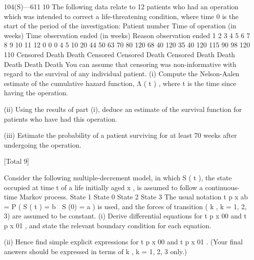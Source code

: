 \documentclass[a4paper,12pt]{article}
\begin{document}
104(S)—611                               10
The following data relate to 12 patients who had an operation which was
intended to correct a life-threatening condition, where time 0 is the start of the
period of the investigation:
Patient number Time of operation
(in weeks) Time observation
ended (in weeks) Reason observation
ended
1
2
3
4
5
6
7
8
9
10
11
12 0
0
0
4
5
10
20
44
50
63
70
80 120
68
40
120
35
40
120
115
90
98
120
110 Censored
Death
Death
Censored
Censored
Death
Censored
Death
Death
Death
Death
Death
You can assume that censoring was non-informative with regard to the survival
of any individual patient.
(i) Compute the Nelson-Aalen estimate of the cumulative hazard function,
Λ ( t ) , where t is the time since having the operation.

(ii) Using the results of part (i), deduce an estimate of the survival function
for patients who have had this operation.

(iii) Estimate the probability of a patient surviving for at least 70 weeks after
undergoing the operation.

[Total 9]

Consider the following multiple-decrement model, in which S ( t ), the state
occupied at time t of a life initially aged x , is assumed to follow a continuous-time
Markov process.
State 1
State 0
State 2
State 3
The usual notation t p x ab = P ( S ( t ) = b  S (0) = a ) is used, and the forces of
transition ( k , k = 1, 2, 3) are assumed to be constant.
(i) Derive differential equations for t p x 00 and t p x 01 , and state the relevant
boundary condition for each equation.

(ii) Hence find simple explicit expressions for t p x 00 and t p x 01 .
(Your final answers should be expressed in terms of  k , k = 1, 2, 3 only.)
\end{document}
